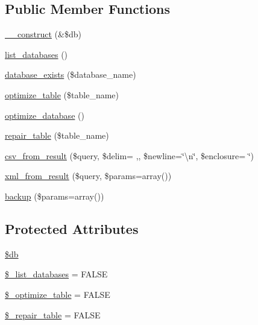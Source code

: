 \subsection*{Public Member Functions}
\begin{DoxyCompactItemize}
\item 
\hyperlink{class_c_i___d_b__utility_aaf2ef772755ec6f361d44e16cc9ffd69}{\+\_\+\+\_\+construct} (\&\$db)
\item 
\hyperlink{class_c_i___d_b__utility_a8486b247a8868504b055622cb2dd34d3}{list\+\_\+databases} ()
\item 
\hyperlink{class_c_i___d_b__utility_ac0ba63aa14b19a37d4773fcc252bde81}{database\+\_\+exists} (\$database\+\_\+name)
\item 
\hyperlink{class_c_i___d_b__utility_a6aed9274f43b64eeee607d172b51529d}{optimize\+\_\+table} (\$table\+\_\+name)
\item 
\hyperlink{class_c_i___d_b__utility_acb26598e177f525b39978f6dfca1f212}{optimize\+\_\+database} ()
\item 
\hyperlink{class_c_i___d_b__utility_a41a627004d26198c69bf466eef7eaeeb}{repair\+\_\+table} (\$table\+\_\+name)
\item 
\hyperlink{class_c_i___d_b__utility_a744897bd3a0fd825b0a4f485d372224c}{csv\+\_\+from\+\_\+result} (\$query, \$delim= \textquotesingle{},\textquotesingle{}, \$newline=\char`\"{}\textbackslash{}n\char`\"{}, \$enclosure= \textquotesingle{}\char`\"{}\textquotesingle{}) 
\item 
\hyperlink{class_c_i___d_b__utility_a09decb7db409060365ad2c20072523f9}{xml\+\_\+from\+\_\+result} (\$query, \$params=array())
\item 
\hyperlink{class_c_i___d_b__utility_abe2b9d47f950dfbaf8c6ec757a9af9a2}{backup} (\$params=array())
\end{DoxyCompactItemize}
\subsection*{Protected Attributes}
\begin{DoxyCompactItemize}
\item 
\hyperlink{class_c_i___d_b__utility_a1fa3127fc82f96b1436d871ef02be319}{\$db}
\item 
\hyperlink{class_c_i___d_b__utility_afe3a5b80562d93d6bc7e2b53c95b7e5a}{\$\+\_\+list\+\_\+databases} = F\+A\+L\+S\+E
\item 
\hyperlink{class_c_i___d_b__utility_a083199e5c22c78912dae0a47bb2d7fad}{\$\+\_\+optimize\+\_\+table} = F\+A\+L\+S\+E
\item 
\hyperlink{class_c_i___d_b__utility_a5cf925cbd52e3f6ba5b7ada3fa436efc}{\$\+\_\+repair\+\_\+table} = F\+A\+L\+S\+E
\end{DoxyCompactItemize}


